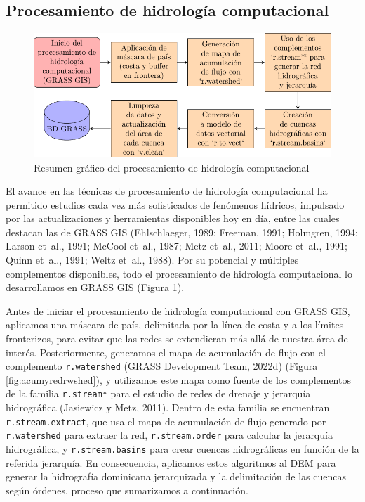 \documentclass[spanish]{article}
\begin{document}
\hypertarget{procesamiento-de-hidrologuxeda-computacional}{%
\subsection{Procesamiento de hidrología
computacional}\label{procesamiento-de-hidrologuxeda-computacional}}

\begin{figure}[H]

{\centering \includegraphics[width=1\linewidth]{figuras/resumen-procesamiento-hidrologia-computacional} 

}

\caption{Resumen gráfico del procesamiento de hidrología computacional}\label{fig:procesamientohidrocompu}
\end{figure}

El avance en las técnicas de procesamiento de hidrología computacional
ha permitido estudios cada vez más sofisticados de fenómenos hídricos,
impulsado por las actualizaciones y herramientas disponibles hoy en día,
entre las cuales destacan las de GRASS GIS (Ehlschlaeger, 1989; Freeman,
1991; Holmgren, 1994; Larson et~al., 1991; McCool et~al., 1987; Metz
et~al., 2011; Moore et~al., 1991; Quinn et~al., 1991; Weltz et~al.,
1988). Por su potencial y múltiples complementos disponibles, todo el
procesamiento de hidrología computacional lo desarrollamos en GRASS GIS
(Figura \ref{fig:procesamientohidrocompu}).

Antes de iniciar el procesamiento de hidrología computacional con GRASS
GIS, aplicamos una máscara de país, delimitada por la línea de costa y a
los límites fronterizos, para evitar que las redes se extendieran más
allá de nuestra área de interés. Posteriormente, generamos el mapa de
acumulación de flujo con el complemento \texttt{r.watershed} (GRASS
Development Team, 2022d) (Figura \ref{fig:acumyredrwshed}), y utilizamos
este mapa como fuente de los complementos de la familia
\texttt{r.stream*} para el estudio de redes de drenaje y jerarquía
hidrográfica (Jasiewicz y Metz, 2011). Dentro de esta familia se
encuentran \texttt{r.stream.extract}, que usa el mapa de acumulación de
flujo generado por \texttt{r.watershed} para extraer la red,
\texttt{r.stream.order} para calcular la jerarquía hidrográfica, y
\texttt{r.stream.basins} para crear cuencas hidrográficas en función de
la referida jerarquía. En consecuencia, aplicamos estos algoritmos al
DEM para generar la hidrografía dominicana jerarquizada y la
delimitación de las cuencas según órdenes, proceso que sumarizamos a
continuación.
\end{document}
